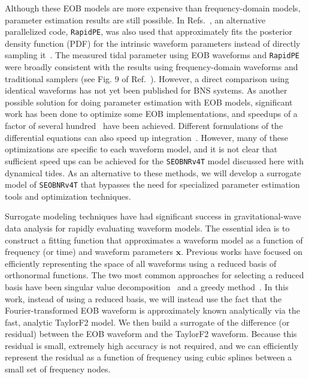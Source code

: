 \documentclass[prd,aps,letter,twocolumn,floatfix,notitlepage,nofootinbib]{revtex4-1}
\def\bx{\mathbf{x}}
\begin{document}
Although these EOB models are more expensive than frequency-domain models, parameter estimation results are still possible. In Refs.~\cite{BNSPE, O2Catalog}, an alternative parallelized code, \texttt{RapidPE}, was also used that approximately fits the posterior density function (PDF) for the intrinsic waveform parameters instead of directly sampling it~\cite{PankowBradyOchsner2015, LangeOshaughnessyRizzo2018}. 
The measured tidal parameter using EOB waveforms and \texttt{RapidPE} were broadly consistent with the results using frequency-domain waveforms and traditional samplers (see Fig. 9 of Ref.~\cite{O2Catalog}). However, a direct comparison using identical waveforms has not yet been published for BNS systems.
As another possible solution for doing parameter estimation with EOB models, significant work has been done to optimize some EOB implementations, and speedups of a factor of several hundred~\cite{DevineEtienneMcWilliams2016} have been achieved. Different formulations of the differential equations can also speed up integration~\cite{NagarNettegno2018}. However, many of these optimizations are specific to each waveform model, and it is not clear that sufficient speed ups can be achieved for the \texttt{SEOBNRv4T} model discussed here with dynamical tides. As an alternative to these methods, we will develop a surrogate model of \texttt{SEOBNRv4T} that bypasses the need for specialized parameter estimation tools and optimization techniques. 

Surrogate modeling techniques have had significant success in gravitational-wave data analysis for rapidly evaluating waveform models. The essential idea is to construct a fitting function that approximates a waveform model as a function of frequency (or time) and waveform parameters $\bx$. Previous works have focused on efficiently representing the space of all waveforms using a reduced basis of orthonormal functions. The two most common approaches for selecting a reduced basis have been singular value decomposition~\cite{Puerrer2014, Puerrer2015} and a greedy method~\cite{FieldGalleyHesthaven2014, LackeyBernuzziGalley2017, BlackmanFieldGalley2015, BlackmanFieldScheel2017a, BlackmanFieldScheel2017b}. In this work, instead of using a reduced basis, we will instead use the fact that the Fourier-transformed EOB waveform is approximately known analytically via the fast, analytic TaylorF2 model. We then build a surrogate of the difference (or residual) between the EOB waveform and the TaylorF2 waveform. Because this residual is small, extremely high accuracy is not required, and we can efficiently represent the residual as a function of frequency using cubic splines between a small set of frequency nodes.
\end{document}
